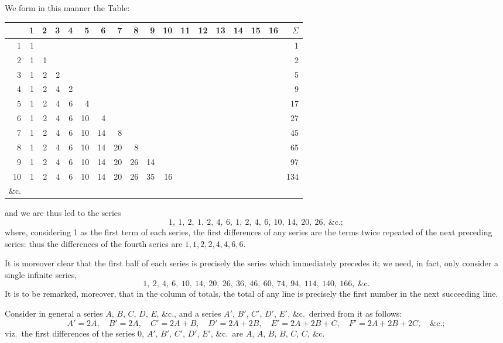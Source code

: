 \documentclass[11pt,a4paper]{book}
\begin{document}
We form in this manner the Table:
\begin{center}
\begin{tabular}{r|rrrrrrrrrrrrrrrr|r}
& 1 & 2 & 3 & 4 & 5 & 6 & 7 & 8 & 9 & 10 & 11 & 12 & 13 & 14 & 15 & 16 & $\Sigma$ \\
\hline
1 & 1 & & & & & & & & & & & & & & & & 1 \\
2 & 1 & 1 & & & & & & & & & & & & & & & 2 \\
3 & 1 & 2 & 2 & & & & & & & & & & & & & & 5 \\
4 & 1 & 2 & 4 & 2 & & & & & & & & & & & & & 9 \\
5 & 1 & 2 & 4 & 6 & 4 & & & & & & & & & & & & 17 \\
6 & 1 & 2 & 4 & 6 & 10 & 4 & & & & & & & & & & & 27 \\
7 & 1 & 2 & 4 & 6 & 10 & 14 & 8 & & & & & & & & & & 45 \\
8 & 1 & 2 & 4 & 6 & 10 & 14 & 20 & 8 & & & & & & & & & 65 \\
9 & 1 & 2 & 4 & 6 & 10 & 14 & 20 & 26 & 14 & & & & & & & & 97 \\
10 & 1 & 2 & 4 & 6 & 10 & 14 & 20 & 26 & 35 & 16 & & & & & & & 134 \\
\&c. & & & & & & & & & & & & & & & & 
\end{tabular}
\end{center}
and we are thus led to the series
\[
1,\ 1,\ 2,\ 1,\ 2,\ 4,\ 6,\ 1,\ 2,\ 4,\ 6,\ 10,\ 14,\ 20,\ 26,\ \&\text{c.};
\]
where, considering 1 as the first term of each series, the first differences of any series are the terms twice repeated of the next preceding series: thus the differences of the fourth series are $1, 1, 2, 2, 4, 4, 6, 6$.

It is moreover clear that the first half of each series is precisely the series which immediately precedes it; we need, in fact, only consider a single infinite series,
\[
1,\ 2,\ 4,\ 6,\ 10,\ 14,\ 20,\ 26,\ 36,\ 46,\ 60,\ 74,\ 94,\ 114,\ 140,\ 166,\ \&\text{c.}
\]
It is to be remarked, moreover, that in the column of totals, the total of any line is precisely the first number in the next succeeding line.

Consider in general a series $A$, $B$, $C$, $D$, $E$, \&c., and a series $A'$, $B'$, $C'$, $D'$, $E'$, \&c.\ derived from it as follows:
\[
A' = 2A, \quad B' = 2A, \quad C' = 2A + B, \quad D' = 2A + 2B, \quad E' = 2A + 2B + C, \quad F' = 2A + 2B + 2C, \quad \&\text{c.};
\]
viz.\ the first differences of the series $0$, $A'$, $B'$, $C'$, $D'$, $E'$, \&c.\ are $A$, $A$, $B$, $B$, $C$, $C$, \&c.
\end{document}
